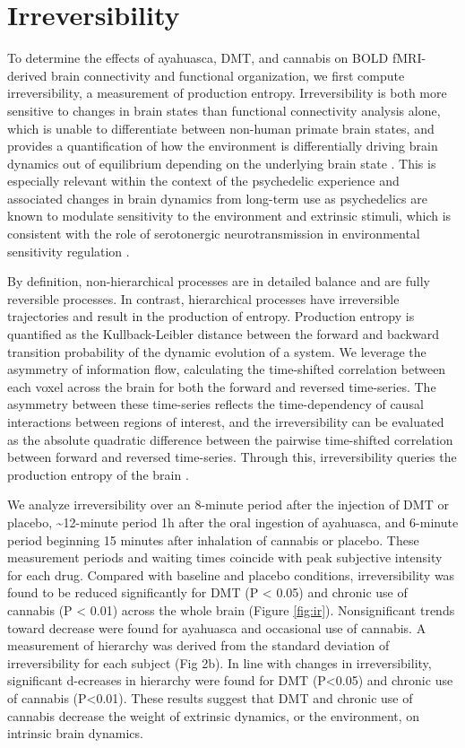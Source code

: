 \section{Irreversibility}
To determine the effects of ayahuasca, DMT, and
cannabis on BOLD fMRI-derived brain connectivity and functional
organization, we first compute irreversibility, a measurement of
production entropy. Irreversibility is both more sensitive to changes in
brain states than functional connectivity analysis alone, which is
unable to differentiate between non-human primate brain states, and
provides a quantification of how the environment is differentially
driving brain dynamics out of equilibrium depending on the underlying
brain state \parencite{Deco2022}. This is especially relevant within the
context of the psychedelic experience and associated changes in brain
dynamics from long-term use as psychedelics are known to modulate
sensitivity to the environment and extrinsic stimuli, which is
consistent with the role of serotonergic neurotransmission in
environmental sensitivity regulation \parencite{Branchi2011,Carhart-Harris2017}.

By definition, non-hierarchical processes are in detailed balance and
are fully reversible processes. In contrast, hierarchical processes have
irreversible trajectories and result in the production of entropy.
Production entropy is quantified as the Kullback-Leibler distance
between the forward and backward transition probability of the dynamic
evolution of a system. We leverage the asymmetry of information flow,
calculating the time-shifted correlation between each voxel across the
brain for both the forward and reversed time-series. The asymmetry
between these time-series reflects the time-dependency of causal
interactions between regions of interest, and the irreversibility can be
evaluated as the absolute quadratic difference between the pairwise
time-shifted correlation between forward and reversed time-series.
Through this, irreversibility queries the production entropy of the
brain \parencite{Lynn2021,SanzPerl2021}.

We analyze irreversibility over an 8-minute period after the injection
of DMT or placebo, \textasciitilde12-minute period 1h after the oral
ingestion of ayahuasca, and 6-minute period beginning 15 minutes after
inhalation of cannabis or placebo. These measurement periods and waiting
times coincide with peak subjective intensity for each drug. Compared
with baseline and placebo conditions, irreversibility was found to be
reduced significantly for DMT (P \textless{} 0.05) and chronic use of
cannabis (P \textless{} 0.01) across the whole brain (Figure \ref{fig:ir}).
Nonsignificant trends toward decrease were found for ayahuasca and
occasional use of cannabis. A measurement of hierarchy was derived from
the standard deviation of irreversibility for each subject (Fig 2b). In
line with changes in irreversibility, significant d-ecreases in
hierarchy were found for DMT (P\textless0.05) and chronic use of
cannabis (P\textless0.01). These results suggest that DMT and chronic
use of cannabis decrease the weight of extrinsic dynamics, or the
environment, on intrinsic brain dynamics.

